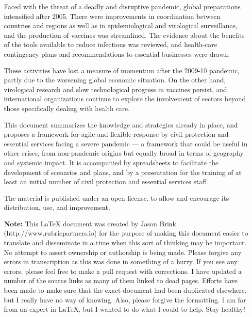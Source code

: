 \documentclass[12pt, a4]{scrartcl}
\begin{document}
Faced with the threat of a deadly and disruptive pandemic, global preparations intensified after 2005. There were improvements in coordination between countries and regions as well as in epidemiological and virological surveillance, and the production of vaccines was streamlined. The evidence about the benefits of the tools available to reduce infections was reviewed, and health-care contingency plans and recommendations to essential businesses were drawn.

These activities have lost a measure of momentum after the 2009-10 pandemic, partly due to the worsening global economic situation. On the other hand, virological research and slow technological progress in vaccines persist, and international organizations continue to explore the involvement of sectors beyond those specifically dealing with health care.

This document summarizes the knowledge and strategies already in place, and proposes a framework for agile and flexible response by civil protection and essential services facing a severe pandemic — a framework that could be useful in other crises, from non-pandemic origins but equally broad in terms of geography and systemic impact. It is accompanied by spreadsheets to facilitate the development of scenarios and plans, and by a presentation for the training of at least an initial number of civil protection and essential services staff.

The material is published under an open license, to allow and encourage its distribution, use, and improvement. 

\textbf{Note: }This LaTeX document was created by Jason Brink (http://www.rubricpartners.io) for the purpose of making this document easier to translate and disseminate in a time when this sort of thinking may be important. No attempt to assert ownership or authorship is being made. Please forgive any errors in transcription as this was done in something of a hurry. If you see any errors, please feel free to make a pull request with corrections. I have updated a number of the source links as many of them linked to dead pages. Efforts have been made to make sure that the exact document had been duplicated elsewhere, but I really have no way of knowing. Also, please forgive the formatting. I am far from an expert in LaTeX, but I wanted to do what I could to help. Stay healthy!
\newpage
\end{document}

